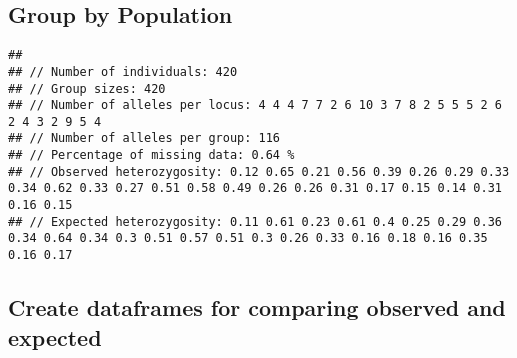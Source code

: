 \documentclass[
]{article}
\newenvironment{Shaded}{\begin{snugshade}}{\end{snugshade}}
\newcommand{\FunctionTok}[1]{\textcolor[rgb]{0.00,0.00,0.00}{#1}}
\newcommand{\NormalTok}[1]{#1}
\newcommand{\OtherTok}[1]{\textcolor[rgb]{0.56,0.35,0.01}{#1}}
\newcommand{\SpecialCharTok}[1]{\textcolor[rgb]{0.00,0.00,0.00}{#1}}
\newcommand{\StringTok}[1]{\textcolor[rgb]{0.31,0.60,0.02}{#1}}
\begin{document}
\hypertarget{group-by-population}{%
\subsection{Group by Population}\label{group-by-population}}

\begin{Shaded}
\end{Shaded}

\begin{verbatim}
## 
## // Number of individuals: 420
## // Group sizes: 420
## // Number of alleles per locus: 4 4 4 7 7 2 6 10 3 7 8 2 5 5 5 2 6 2 4 3 2 9 5 4
## // Number of alleles per group: 116
## // Percentage of missing data: 0.64 %
## // Observed heterozygosity: 0.12 0.65 0.21 0.56 0.39 0.26 0.29 0.33 0.34 0.62 0.33 0.27 0.51 0.58 0.49 0.26 0.26 0.31 0.17 0.15 0.14 0.31 0.16 0.15
## // Expected heterozygosity: 0.11 0.61 0.23 0.61 0.4 0.25 0.29 0.36 0.34 0.64 0.34 0.3 0.51 0.57 0.51 0.3 0.26 0.33 0.16 0.18 0.16 0.35 0.16 0.17
\end{verbatim}

\hypertarget{create-dataframes-for-comparing-observed-and-expected}{%
\subsection{Create dataframes for comparing observed and
expected}\label{create-dataframes-for-comparing-observed-and-expected}}

\begin{Shaded}
\end{Shaded}
\end{document}
